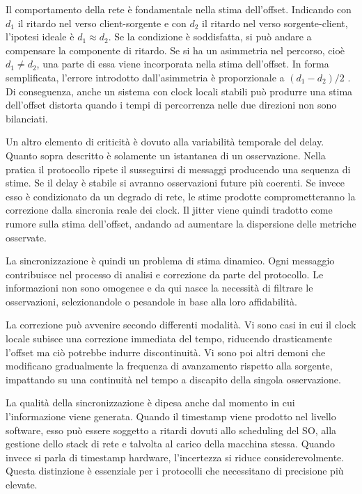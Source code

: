 Il comportamento della rete è fondamentale nella stima dell'offset. Indicando
con $d_{1}$ il ritardo nel verso client-sorgente e con $d_{2}$ il ritardo nel
verso sorgente-client, l'ipotesi ideale è $d_{1}\approx d_{2}$. 
Se la condizione è soddisfatta, si può andare a compensare la componente di ritardo.
Se si ha un asimmetria nel percorso, cioè $d_{1}\neq d_{2}$, una parte di essa viene
incorporata nella stima dell'offset. In forma semplificata, l'errore introdotto
dall'asimmetria è proporzionale a $(d_{1}- d_{2})/2$
\cite{martinNetworkTimeProtocol2010}. Di conseguenza, anche un sistema con clock
locali stabili può produrre una stima dell'offset distorta quando i tempi di
percorrenza nelle due direzioni non sono bilanciati.

Un altro elemento di criticità è dovuto alla variabilità temporale del delay.
Quanto sopra descritto è solamente un istantanea di un osservazione. Nella pratica il protocollo 
ripete il susseguirsi di messaggi producendo una sequenza di stime. 
Se il delay è stabile si avranno osservazioni future più coerenti. Se invece esso è condizionato 
da un degrado di rete, le stime prodotte comprometteranno la correzione dalla sincronia reale dei clock.
Il jitter viene quindi tradotto come rumore sulla stima dell'offset, andando ad aumentare la dispersione delle metriche osservate.

La sincronizzazione è quindi un problema di stima dinamico. Ogni messaggio 
contribuisce nel processo di analisi e correzione da parte del protocollo.
Le informazioni non sono omogenee e da qui nasce la necessità di filtrare le osservazioni, selezionandole
o pesandole in base alla loro affidabilità.


La correzione può avvenire secondo differenti modalità. Vi sono casi in cui il clock
locale subisce una correzione immediata del tempo, riducendo drasticamente l'offset
ma ciò potrebbe indurre discontinuità. Vi sono poi altri demoni che modificano gradualmente
la frequenza di avanzamento rispetto alla sorgente, impattando su una
continuità nel tempo a discapito della singola osservazione.

La qualità della sincronizzazione è dipesa anche dal momento in cui l'informazione
viene generata. Quando il timestamp viene prodotto nel livello software, esso può essere 
soggetto a ritardi dovuti allo scheduling del SO, alla gestione dello stack di rete e talvolta 
al carico della macchina stessa. Quando invece si parla di timestamp hardware, l'incertezza si riduce considerevolmente. 
Questa distinzione è essenziale per i protocolli che necessitano di precisione più elevate.

